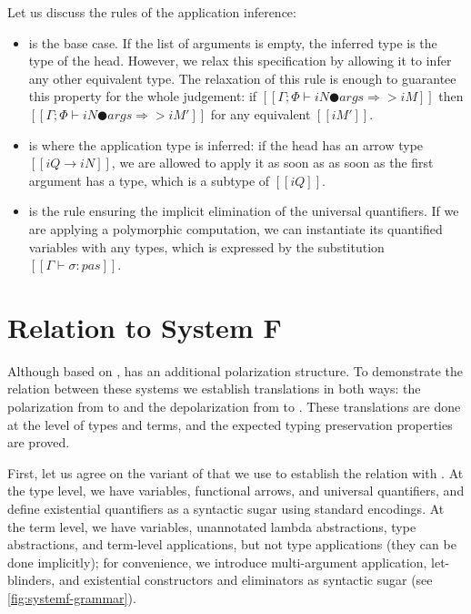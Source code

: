 \documentclass[acmsmall,natbib=false,review,anonymous]{acmart}
\begin{document}
Let us discuss the rules of the application inference:
\begin{itemize}
  \item {} 
    is the base case. If the list of arguments is empty, 
    the inferred type is the type of the head. 
    However, we relax this specification by allowing it to 
    infer any other equivalent type. 
    The relaxation of this rule is enough to guarantee 
    this property for the whole judgement:
    if $[[Γ ; Φ ⊢ iN ● args ⇒> iM]]$ then 
    $[[Γ ; Φ ⊢ iN ● args ⇒> iM']]$ for any equivalent 
    $[[iM']]$.
  \item {}
    is where the application type is inferred: 
    if the head has an arrow type $[[iQ → iN]]$,
     we are allowed to apply it as soon as 
    as soon as the first argument has a type, which is a subtype of $[[iQ]]$.
  \item {}
    is the rule ensuring the implicit elimination of the universal quantifiers. 
    If we are applying a polymorphic computation, 
    we can instantiate its quantified variables with any types,
    which is expressed by the substitution $[[Γ ⊢ σ : {pas}]]$.
\end{itemize}


\section{Relation to System F}

Although based on \systemf, \fexists has an additional polarization structure.
To demonstrate the relation between these systems we establish translations in
both ways: the polarization from \systemf to \fexists and the depolarization
from \fexists to \systemf. These translations are done at the level of types and
terms, and the expected typing preservation properties are proved.

First, let us agree on the variant of \systemf that we use to establish the
relation with \fexists. At the type level, we have variables, functional arrows,
and universal quantifiers, and define existential quantifiers as a syntactic
sugar using standard encodings. At the term level, we have variables,
unannotated lambda abstractions, type abstractions, and term-level applications,
but not type applications (they can be done implicitly); for convenience, we
introduce multi-argument application, let-blinders, and existential constructors
and eliminators as syntactic sugar (see \cref{fig:systemf-grammar}).
\end{document}
